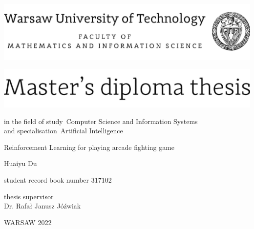 \documentclass[12pt,twoside,a4paper]{article}
\newcommand{\discipline}{Computer Science and Information Systems}
\renewcommand{\title}{Reinforcement Learning for playing arcade fighting game}
\newcommand{\supervisor}{Dr. Rafał Janusz Jóźwiak}
\newcommand{\spec}{Artificial Intelligence}
\renewcommand{\year}{2022}
\newcommand{\authori}{Huaiyu Du}
\newcommand{\albumi}{317102}
\begin{document}
\pagestyle{empty}


\begin{center}
\includegraphics[scale=1.]{img/wut}
\vspace{40pt}


\includegraphics[scale=1.]{img/master} %

{ \arial
in the field of study~\discipline 
\\
and specialisation~\spec

\vspace{30pt}
{\arial \large \title}


\vspace{40pt}

{\arial \huge \authori }

\vspace{5pt}

student record book number \albumi


\vspace{40pt}

thesis supervisor \\
{\arial \supervisor}


\vfill
 
WARSAW \year \\
}
\end{center}


%
%
\end{document}

